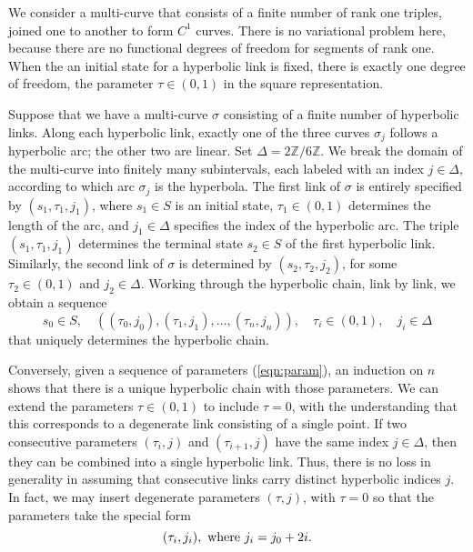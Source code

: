 \documentclass[11pt]{amsart}
\newcommand{\ring}[1]{\mathbb{#1}}
\def\ta{{\tau}}
\begin{document}
We consider a multi-curve that consists of a finite number of rank one
triples, joined one to another to form $C^1$ curves.  There is no
variational problem here, because there are no functional degrees of
freedom for segments of rank one.  When the an initial state for a
hyperbolic link is fixed, there is exactly one degree of freedom, the
parameter $\ta\in(0,1)$ in the square representation.

Suppose that we have a multi-curve $\sigma$ consisting of a finite
number of hyperbolic links.  Along each hyperbolic link, exactly one
of the three curves $\sigma_j$ follows a hyperbolic arc; the other two
are linear.  Set $\Delta=2\ring{Z}/6\ring{Z}$.  We break the domain of
the multi-curve into finitely many subintervals, each labeled with an
index $j\in\Delta$, according to which arc $\sigma_j$ is the
hyperbola.  The first link of $\sigma$ is entirely specified by
$(s_1,\ta_1,j_1)$, where $s_1\in S$ is an initial state,
$\ta_1\in(0,1)$ determines the length of the arc, and $j_1\in\Delta$
specifies the index of the hyperbolic arc.  The triple 
$(s_1,\ta_1,j_1)$ determines the terminal state $s_2\in S$ of the first
hyperbolic link.  Similarly, the second link of $\sigma$ is determined
by $(s_2,\ta_2,j_2)$, for some $\ta_2\in (0,1)$ and $j_2\in\Delta$.
Working through the hyperbolic chain, link by link, we obtain a
sequence
\begin{equation}\label{eqn:param}
  s_0\in S,\quad ((\ta_0,j_0),(\ta_1,j_1),\ldots,
(\ta_n,j_n)),\quad \ta_i\in(0,1),\quad j_i\in\Delta
\end{equation}
that uniquely determines the hyperbolic chain.

Conversely, given a sequence of parameters (\ref{eqn:param}), an
induction on $n$ shows that there is a unique hyperbolic chain with
those parameters.  We can extend the parameters $\ta\in (0,1)$ to
include $\ta=0$, with the understanding that this corresponds to a
degenerate link consisting of a single point.  If two consecutive
parameters $(\ta_i,j)$ and $(\ta_{i+1},j)$ have the same index
$j\in\Delta$, then they can be combined into a single hyperbolic link.
Thus, there is no loss in generality in assuming that consecutive
links carry distinct hyperbolic indices $j$.  In fact, we may insert
degenerate parameters $(\ta,j)$, with $\ta=0$ so that the parameters
take the special form
\begin{equation}\label{eqn:ji}
  (\ta_i,j_i),\hbox{ where } j_i = j_0 + 2 i.
\end{equation}
\end{document}

